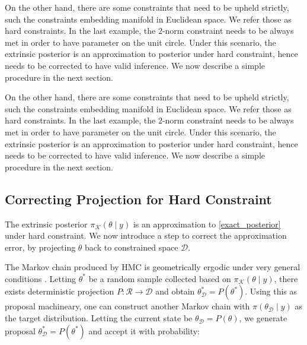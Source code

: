 \documentclass[10pt]{article}
\newcommand{\leo}[1]{{\color{blue}{LD: #1}}}
\newcommand{\mc}[1]{\mathcal{#1}}
\DeclareMathOperator{\1}{\mathbbm{1}}
\begin{document}
On the other hand, there are some constraints that need to be upheld strictly, such the constraints embedding manifold in Euclidean space. We refer those as hard constraints. In the last example, the $2$-norm constraint needs to be always met in order to have parameter on the unit circle. Under this scenario, the extrinsic posterior is an approximation to posterior under hard constraint, hence needs to be corrected to have valid inference. We now describe a simple procedure in the next section.



On the other hand, there are some constraints that need to be upheld strictly, such the constraints embedding manifold in Euclidean space. We refer those as hard constraints. In the last example, the $2$-norm constraint needs to be always met in order to have parameter on the unit circle. Under this scenario, the extrinsic posterior is an approximation to posterior under hard constraint, hence needs to be corrected to have valid inference. We now describe a simple procedure in the next section.

\subsection{Correcting Projection for Hard Constraint}
 
 The extrinsic posterior $\pi_{\mc K}(\theta \mid y)$ is an approximation to \eqref{exact_posterior} under hard constraint. We now introduce a step to correct the approximation error, by projecting $\theta$ back to constrained space $\mc D$.
 
The Markov chain produced by HMC is geometrically ergodic under very general conditions \citep{livingstone2016geometric}. Letting $\theta^*$ be a random sample collected based on $\pi_{\mc K}(\theta \mid y)$, there exists deterministic projection $P: \mc R\rightarrow \mc D$ and obtain $\theta^*_{\mc D}= P(\theta^*)$. Using this as proposal machineary, one can construct another Markov chain with $\pi(\theta_{\mc D}  \mid y)$ as the target distribution. Letting the current state be $\theta_{\mc D} = P(\theta)$, we generate proposal $\theta^*_{\mc D}= P(\theta^*)$ and accept it with probability:
\end{document}
